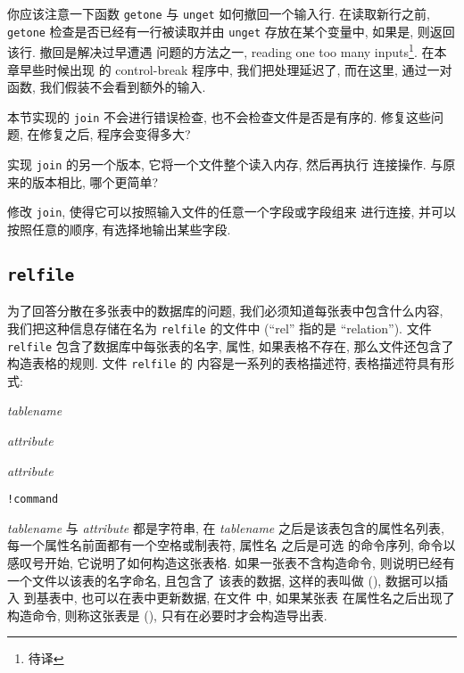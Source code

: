 你应该注意一下函数 \texttt{getone} 与 \texttt{unget} 如何撤回一个输入行.
在读取新行之前, \texttt{getone} 检查是否已经有一行被读取并由
\texttt{unget} 存放在某个变量中, 如果是, 则返回该行. 撤回是解决过早遭遇
问题的方法之一, reading one too many inputs\footnote{待译}.
在本章早些时候出现 的 control-break 程序中, 我们把处理延迟了, 而在这里,
通过一对函数, 我们假装不会看到额外的输入.

\begin{exercise}
    本节实现的 \texttt{join} 不会进行错误检查, 也不会检查文件是否是有序的.
    修复这些问题, 在修复之后, 程序会变得多大?
\end{exercise}

\begin{exercise}
    实现 \texttt{join} 的另一个版本, 它将一个文件整个读入内存, 然后再执行 
    连接操作. 与原来的版本相比, 哪个更简单?
\end{exercise}

\begin{exercise}
    修改 \texttt{join}, 使得它可以按照输入文件的任意一个字段或字段组来
    进行连接, 并可以按照任意的顺序, 有选择地输出某些字段.
\end{exercise}

\subsection{\texttt{relfile}}
为了回答分散在多张表中的数据库的问题, 我们必须知道每张表中包含什么内容,
我们把这种信息存储在名为 \texttt{relfile} 的文件中 (``rel'' 指的是
``relation''). 文件 \texttt{relfile} 包含了数据库中每张表的名字, 属性,
如果表格不存在, 那么文件还包含了构造表格的规则. 文件 \texttt{relfile} 的
内容是一系列的表格描述符, 表格描述符具有形式:
\begin{pattern}
    \indent\textit{tablename} \par 
    \indent\indent\textit{attribute} \par 
    \indent\indent\textit{attribute} \par 
    \indent\indent\indent\cdots     \par
    \indent\indent\texttt{!}\texttt{command} \par
    \indent\indent\indent\cdots
\end{pattern}
\textit{tablename} 与 \textit{attribute} 都是字符串, 在 \textit{tablename} 
之后是该表包含的属性名列表, 每一个属性名前面都有一个空格或制表符, 属性名
之后是可选 的命令序列, 命令以感叹号开始, 它说明了如何构造这张表格.
如果一张表不含构造命令, 则说明已经有一个文件以该表的名字命名, 且包含了
该表的数据, 这样的表叫做  (), 数据可以插入
到基表中, 也可以在表中更新数据, 在文件  中, 如果某张表
在属性名之后出现了构造命令, 则称这张表是  (), 只有在必要时才会构造导出表.

